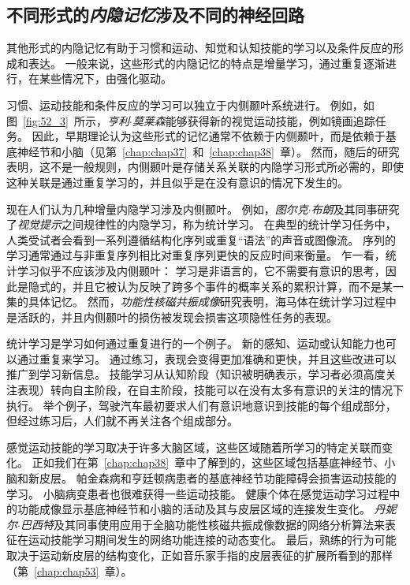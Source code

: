 \subsection{不同形式的\textit{内隐记忆}涉及不同的神经回路}

其他形式的内隐记忆有助于习惯和运动、知觉和认知技能的学习以及条件反应的形成和表达。
一般来说，这些形式的内隐记忆的特点是增量学习，通过重复逐渐进行，在某些情况下，由强化驱动。


习惯、运动技能和条件反应的学习可以独立于内侧颞叶系统进行。
例如，如图~\ref{fig:52_3}~所示，\textit{亨利$\cdot$莫莱森}能够获得新的视觉运动技能，例如镜画追踪任务。
因此，早期理论认为这些形式的记忆通常不依赖于内侧颞叶，而是依赖于基底神经节和小脑（见第~\ref{chap:chap37}~和~\ref{chap:chap38}~章）。
然而，随后的研究表明，这不是一般规则，内侧颞叶是存储关系关联的内隐学习形式所必需的，即使这种关联是通过重复学习的，并且似乎是在没有意识的情况下发生的。


现在人们认为几种增量内隐学习涉及内侧颞叶。
例如，\textit{图尔克$\cdot$布朗}及其同事研究了\textit{视觉提示}之间规律性的内隐学习，称为统计学习。
在典型的统计学习任务中，人类受试者会看到一系列遵循结构化序列或重复“语法”的声音或图像流。
序列的学习通常通过与非重复序列相比对重复序列更快的反应时间来衡量。
乍一看，统计学习似乎不应该涉及内侧颞叶：
学习是非语言的，它不需要有意识的思考，因此是隐式的，并且它被认为反映了跨多个事件的概率关系的累积计算，而不是某一集的具体记忆。
然而，\textit{功能性核磁共振成像}研究表明，海马体在统计学习过程中是活跃的，并且内侧颞叶的损伤被发现会损害这项隐性任务的表现。


统计学习是学习如何通过重复进行的一个例子。
新的感知、运动或认知能力也可以通过重复来学习。
通过练习，表现会变得更加准确和更快，并且这些改进可以推广到学习新信息。
技能学习从认知阶段（知识被明确表示，学习者必须高度关注表现）转向自主阶段，在自主阶段，技能可以在没有太多有意识的关注的情况下执行。
举个例子，驾驶汽车最初要求人们有意识地意识到技能的每个组成部分，但经过练习后，人们就不再关注各个组成部分。


感觉运动技能的学习取决于许多大脑区域，这些区域随着所学习的特定关联而变化。
正如我们在第~\ref{chap:chap38}~章中了解到的，这些区域包括基底神经节、小脑和新皮层。
帕金森病和亨廷顿病患者的基底神经节功能障碍会损害运动技能的学习。
小脑病变患者也很难获得一些运动技能。
健康个体在感觉运动学习过程中的功能成像显示基底神经节和小脑的活动及其与皮层区域的连接发生变化。
\textit{丹妮尔$\cdot$巴西特}及其同事使用应用于全脑功能性核磁共振成像数据的网络分析算法来表征在运动技能学习期间发生的网络功能连接的动态变化。
最后，熟练的行为可能取决于运动新皮层的结构变化，正如音乐家手指的皮层表征的扩展所看到的那样（第~\ref{chap:chap53}~章）。


